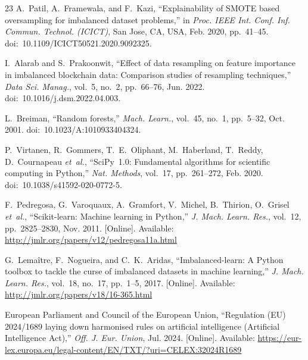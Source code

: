 \documentclass[conference,a4paper]{IEEEtran}
\begin{document}
\begin{thebibliography}{23}
A.~Patil, A.~Framewala, and F.~Kazi,
``Explainability of SMOTE based oversampling for imbalanced dataset
problems,''
in \emph{Proc. IEEE Int. Conf. Inf. Commun. Technol. (ICICT)},
San Jose, CA, USA, Feb. 2020, pp.~41--45.
doi:~10.1109/ICICT50521.2020.9092325.

I.~Alarab and S.~Prakoonwit,
``Effect of data resampling on feature importance in imbalanced blockchain
data: Comparison studies of resampling techniques,''
\emph{Data Sci. Manag.}, vol.~5, no.~2, pp.~66--76, Jun. 2022.
doi:~10.1016/j.dsm.2022.04.003.

L.~Breiman,
``Random forests,''
\emph{Mach. Learn.}, vol.~45, no.~1, pp.~5--32, Oct. 2001.
doi:~10.1023/A:1010933404324.

P.~Virtanen, R.~Gommers, T.~E.~Oliphant, M.~Haberland, T.~Reddy,
D.~Cournapeau \emph{et~al.},
``SciPy~1.0: Fundamental algorithms for scientific computing in Python,''
\emph{Nat. Methods}, vol.~17, pp.~261--272, Feb. 2020.
doi:~10.1038/s41592-020-0772-5.

F.~Pedregosa, G.~Varoquaux, A.~Gramfort, V.~Michel, B.~Thirion,
O.~Grisel \emph{et~al.},
``Scikit-learn: Machine learning in Python,''
\emph{J. Mach. Learn. Res.}, vol.~12, pp.~2825--2830, Nov. 2011.
[Online]. Available: \url{http://jmlr.org/papers/v12/pedregosa11a.html}

G.~Lema\^{i}tre, F.~Nogueira, and C.~K.~Aridas,
``Imbalanced-learn: A Python toolbox to tackle the curse of imbalanced
datasets in machine learning,''
\emph{J. Mach. Learn. Res.}, vol.~18, no.~17, pp.~1--5, 2017.
[Online]. Available: \url{http://jmlr.org/papers/v18/16-365.html}

European Parliament and Council of the European Union,
``Regulation (EU) 2024/1689 laying down harmonised rules on artificial
intelligence (Artificial Intelligence Act),''
\emph{Off. J. Eur. Union}, Jul. 2024. [Online]. Available:
\url{https://eur-lex.europa.eu/legal-content/EN/TXT/?uri=CELEX:32024R1689}

\end{thebibliography}

\end{document}
